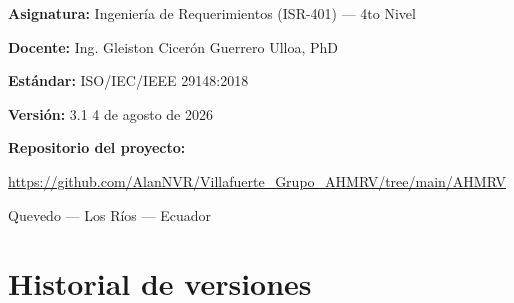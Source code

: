 \documentclass[11pt,a4paper]{article}
\begin{document}
\begin{titlepage}
\vspace{0.9cm}
{\bfseries Asignatura:} Ingeniería de Requerimientos (ISR-401) --- 4to Nivel\par
{\bfseries Docente:} Ing. Gleiston Cicerón Guerrero Ulloa, PhD\par
{\bfseries Estándar:} ISO/IEC/IEEE 29148:2018\par
{\bfseries Versión:} 3.1   4 de agosto de 2026\par

\vspace{0.8cm}
{\bfseries Repositorio del proyecto:}\par
\url{https://github.com/AlanNVR/Villafuerte_Grupo_AHMRV/tree/main/AHMRV}

\vfill
{\small Quevedo --- Los Ríos --- Ecuador\par}
\end{titlepage}

\section*{Historial de versiones}
\end{document}
